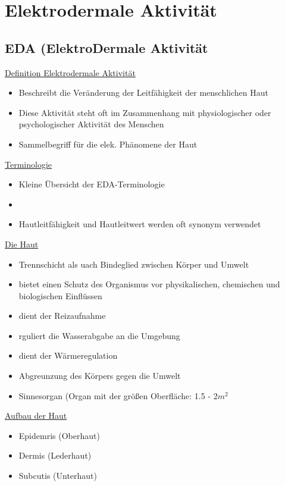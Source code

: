 \documentclass[a4paper,10pt,oneside]{article}
\begin{document}
 		
\section{Elektrodermale Aktivität}
\subsection{EDA (ElektroDermale Aktivität}

\underline{Definition Elektrodermale Aktivität} \\
	\begin{itemize}
		\item Beschreibt die Veränderung der Leitfähigkeit der menschlichen Haut
		\item Diese Aktivität steht oft im Zusammenhang mit physiologischer oder psychologischer Aktivität des Menschen
		\item Sammelbegriff für die elek. Phänomene der Haut
	\end{itemize}
	
\underline{Terminologie} \\
	\begin{itemize}
		\item Kleine Übersicht der EDA-Terminologie
		\item[] %
		\item Hautleitfähigkeit und Hautleitwert werden oft synonym verwendet
	\end{itemize}
	
\underline{Die Haut} \\
	\begin{itemize}
		\item Trennschicht als uach Bindeglied zwischen Körper und Umwelt
		\item bietet einen Schutz des Organismus vor physikalischen, chemischen und biologischen Einflüssen
		\item dient der Reizaufnahme
		\item rguliert die Wasserabgabe an die Umgebung
		\item dient der Wärmeregulation
		\item Abgreunzung des Körpers gegen die Umwelt
		\item Sinnesorgan (Organ mit der größen Oberfläche: 1.5 - 2$m^2$
	\end{itemize}

\underline{Aufbau der Haut} \\
	\begin{itemize}
		\item Epidemris (Oberhaut)
		\item Dermis (Lederhaut)
		\item Subcutis (Unterhaut)
	\end{itemize}
	
\end{document}
